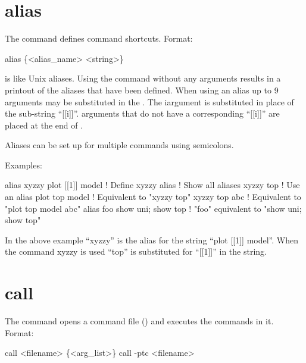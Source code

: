 
\vfil
\break

\section{alias}
\label{s:alias}

The  command defines command shortcuts. Format:
\begin{example}
  alias \{<alias_name> <string>\}
\end{example}

\vskip 0.2in

 is like Unix aliases. Using the  command without
any arguments results in a printout of the aliases that have been
defined. When using an alias up to 9 arguments may be substituted in
the . The i\Th argument is substituted in place of the
sub-string ``[[i]]''.  arguments that do not have a corresponding
``[[i]]'' are placed at the end of .

Aliases can be set up for multiple commands using semicolons.

Examples:
\begin{example}
    alias xyzzy plot [[1]] model  ! Define xyzzy
    alias                         ! Show all aliases
    xyzzy top                     ! Use an alias
    plot top model                ! Equivalent to "xyzzy top"
    xyzzy top abc                 ! Equivalent to "plot top model abc"
    alias foo  show uni; show top ! "foo" equivalent to "show uni; show top"
\end{example}
In the above example ``xyzzy'' is the alias for the string ``plot [[1]]
model''.  When the command xyzzy is used ``top'' is substituted
for ``[[1]]'' in the string.

\section{call}
\label{s:call}

The  command opens a command file () and
executes the commands in it. 
Format:
\begin{example}
  call <filename> \{<arg_list>\}  \Strut
  call -ptc <filename>
\end{example}

